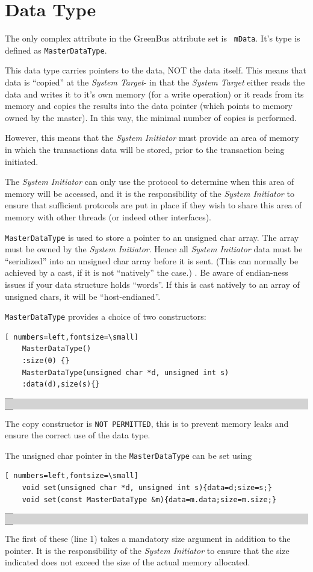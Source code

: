 \documentclass[12pt,oneside]{gsbook}
\newcommand{\master}{{\em System Initiator}\xspace}
\newcommand{\slave}{{\em System Target}\xspace}
\def\example#1{\begin{center}\colorbox{lightgrey}{\begin{tabular}{|p{0.6\paperwidth}|}\hline\\#1\\ \\ \hline\end{tabular}}\end{center}}
\newenvironment{exampleenv}{\begin{lrbox}{\examplebox}\begin{minipage}{0.6\paperwidth}}{\end{minipage}\end{lrbox}\example{\usebox{\examplebox}}}
\begin{document}
\section{Data Type}

The only complex attribute in the GreenBus attribute set is {\tt
mData}. It's type is defined as {\tt MasterDataType}. 

This data type carries pointers to the data, NOT the data itself. This means that data
is ``copied'' at the \slave - in that the \slave either reads the data and writes it to it's own
memory (for a write operation) or it reads from its memory and copies the results into the data
pointer (which points to memory owned by the master). In this way, the minimal number of copies is performed.

However, this means that the \master must provide an area of memory in which the transactions
data will be stored, prior to the transaction being initiated. 

The \master can only use the protocol to determine when this area of memory will be accessed, and it
is the responsibility of the \master to ensure that sufficient protocols are put in place if they
wish to share this area of memory with other threads (or indeed other interfaces).

{\tt MasterDataType} is used to store a pointer to an unsigned char
array. The array must be owned by the \master. Hence all \master data
must be ``serialized'' into an unsigned char array before it is
sent. (This can normally be achieved by a cast, if it is not
``natively'' the case.) . Be aware of endian-ness issues if your data
structure holds ``words''. If this is cast natively to an array of
unsigned chars, it will be ``host-endianed''.

{\tt MasterDataType} provides a choice of two constructors:
\begin{exampleenv}
\begin{Verbatim}[ numbers=left,fontsize=\small]
    MasterDataType()
	:size(0) {}
    MasterDataType(unsigned char *d, unsigned int s)
	:data(d),size(s){}
\end{Verbatim}
\end{exampleenv}
The copy constructor is {\tt NOT PERMITTED}, this is to prevent memory
leaks and ensure the correct use of the data type.


The unsigned char pointer in the  {\tt MasterDataType} can be set
using
\begin{exampleenv}
\begin{Verbatim}[ numbers=left,fontsize=\small]
    void set(unsigned char *d, unsigned int s){data=d;size=s;}
    void set(const MasterDataType &m){data=m.data;size=m.size;}
\end{Verbatim}
\end{exampleenv}
The first of these (line 1) takes a mandatory size argument in
addition to the pointer. It is the responsibility of the \master to
ensure that the size indicated does not exceed the size of the actual
memory allocated.
\end{document}
